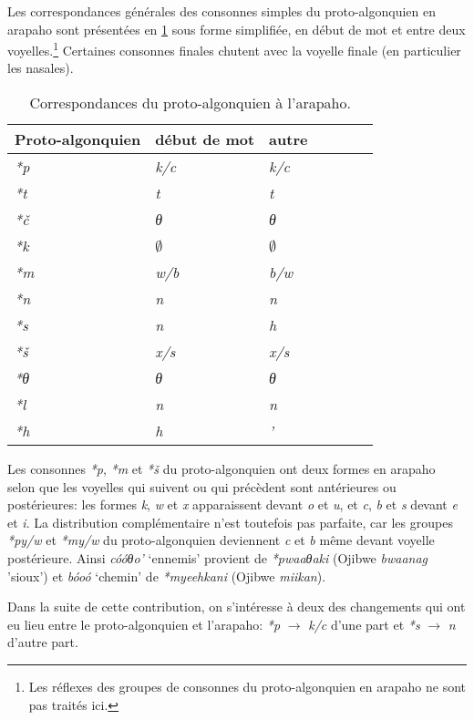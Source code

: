 \documentclass[twoside,a4paper,11pt]{article}
\newcommand{\ipa}[1]{{\phon\textit{#1}}}
\newcommand{\Σ}{\greek{Σ}}
\begin{document}
Les correspondances générales des consonnes simples du proto-algonquien en arapaho sont présentées en \ref{tab:c.simple.arapaho} sous forme simplifiée, en début de mot et entre deux voyelles.\footnote{Les réflexes des groupes de consonnes du proto-algonquien en arapaho ne sont pas traités ici.} Certaines consonnes finales chutent avec la voyelle finale (en particulier les nasales).
 \begin{table}[H]
\caption{Correspondances du proto-algonquien à l'arapaho.} \centering  \label{tab:c.simple.arapaho}
\begin{tabular}{lllllll}
\toprule
Proto-algonquien & début de mot  & autre \\
\midrule
\ipa{*p} & 	\ipa{k/c} & 	\ipa{k/c} &   	\\
\ipa{*t} & 	\ipa{t} & 	\ipa{t} & 	  	\\
\ipa{*č} & 	\ipa{θ} & 	\ipa{θ}   	\\
\ipa{*k} & 	$\emptyset$ & 	$\emptyset$   	\\
\ipa{*m} & 	\ipa{w/b} & 	\ipa{b/w}  & 	  	\\
\ipa{*n} & 	\ipa{n} & 	\ipa{n} & 	  	\\
\ipa{*s} & 	\ipa{n} & 	\ipa{h} & 	  	\\
\ipa{*š} & 	\ipa{x/s} & 	\ipa{x/s}  & 	  & 	\\
\ipa{*θ} & 	\ipa{θ} & 	\ipa{θ} & 	  	\\
\ipa{*l} & 	\ipa{n} & 	\ipa{n} & 	  	\\
\ipa{*h} & 	\ipa{h} & 	\ipa{'} & 	  	\\
\bottomrule
\end{tabular}
\end{table}

Les consonnes \ipa{*p}, \ipa{*m} et \ipa{*š} du proto-algonquien ont deux formes en arapaho selon que les voyelles qui suivent ou qui précèdent sont antérieures ou postérieures: les formes \ipa{k}, \ipa{w} et \ipa{x} apparaissent devant \ipa{o} et \ipa{u}, et \ipa{c}, \ipa{b} et \ipa{s} devant \ipa{e} et \ipa{i}. La distribution complémentaire n'est toutefois pas parfaite, car les groupes \ipa{*py/w} et \ipa{*my/w} du proto-algonquien deviennent \ipa{c} et \ipa{b} même devant voyelle postérieure. Ainsi \ipa{cóóθo'} `ennemis' provient de \ipa{*pwaaθaki} (Ojibwe \ipa{bwaanag} 'sioux') et \ipa{bóoó} `chemin' de \ipa{*myeehkani} (Ojibwe \ipa{miikan}).

Dans la suite de cette contribution, on s'intéresse à deux des changements qui ont eu lieu entre le proto-algonquien et l'arapaho: \ipa{*p} $\rightarrow$ \ipa{k/c} d'une part et \ipa{*s} $\rightarrow$ \ipa{n} d'autre part.
\end{document}
